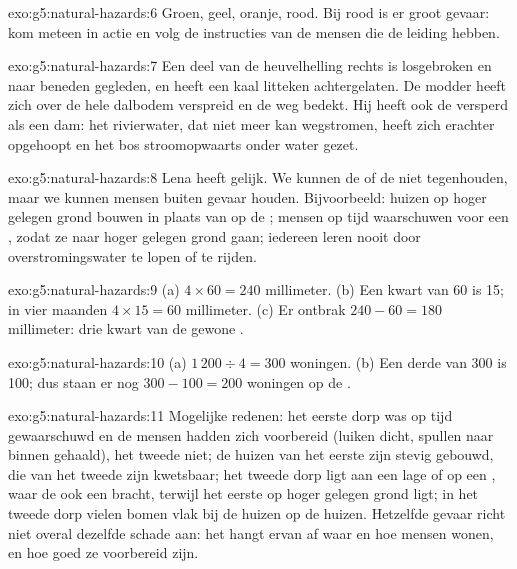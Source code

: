 \begin{solution}{exo:g5:natural-hazards:6}
Groen, geel, oranje, rood. Bij rood is er groot gevaar: kom meteen in actie
en volg de instructies van de mensen die de leiding hebben.
\end{solution}

\begin{solution}{exo:g5:natural-hazards:7}
Een deel van de heuvelhelling rechts is losgebroken en naar beneden
gegleden, en heeft een kaal litteken achtergelaten. De modder heeft zich
over de hele dalbodem verspreid en de weg bedekt. Hij heeft ook de 
versperd als een dam: het rivierwater, dat niet meer kan wegstromen, heeft
zich erachter opgehoopt en het bos stroomopwaarts onder water gezet.
\end{solution}

\begin{solution}{exo:g5:natural-hazards:8}
Lena heeft gelijk. We kunnen de  of de  niet tegenhouden, maar
we kunnen mensen buiten gevaar houden. Bijvoorbeeld: huizen op hoger
gelegen grond bouwen in plaats van op de ; mensen op
tijd waarschuwen voor een , zodat ze naar hoger gelegen grond
gaan; iedereen leren nooit door overstromingswater te lopen of te rijden.
\end{solution}

\begin{solution}{exo:g5:natural-hazards:9}
(a) $4 \times 60 = 240$ millimeter. (b) Een kwart van 60 is 15; in vier
maanden $4 \times 15 = 60$ millimeter. (c) Er ontbrak $240 - 60 = 180$
millimeter: drie kwart van de gewone .
\end{solution}

\begin{solution}{exo:g5:natural-hazards:10}
(a) $1\,200 \div 4 = 300$ woningen. (b) Een derde van 300 is 100; dus staan
er nog $300 - 100 = 200$ woningen op de .
\end{solution}

\begin{solution}{exo:g5:natural-hazards:11}
Mogelijke redenen: het eerste dorp was op tijd gewaarschuwd en de mensen
hadden zich voorbereid (luiken dicht, spullen naar binnen gehaald), het
tweede niet; de huizen van het eerste zijn stevig gebouwd, die van het
tweede zijn kwetsbaar; het tweede dorp ligt aan een lage  of op een
, waar de  ook een  bracht, terwijl het
eerste op hoger gelegen grond ligt; in het tweede dorp vielen bomen vlak bij
de huizen op de huizen. Hetzelfde gevaar richt niet overal dezelfde schade
aan: het hangt ervan af waar en hoe mensen wonen, en hoe goed ze voorbereid
zijn.
\end{solution}
